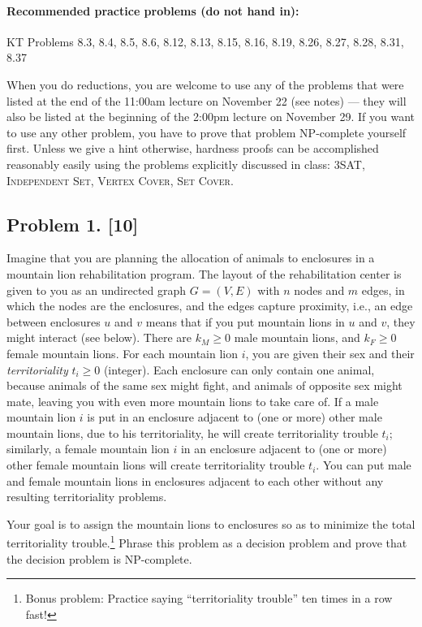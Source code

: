 \documentclass[10pt]{article}
\begin{document}
\paragraph{Recommended practice problems (do not hand in):} KT Problems 8.3, 8.4, 8.5, 8.6, 8.12, 8.13, 8.15, 8.16, 8.19, 8.26, 8.27, 8.28, 8.31, 8.37


\newpage

When you do reductions, you are welcome to use any of the problems that were listed at the end of the 11:00am lecture on November 22 (see notes) --- they will also be listed at the beginning of the 2:00pm lecture on November 29. If you want to use any other problem, you have to prove that problem NP-complete yourself first.
Unless we give a hint otherwise, hardness proofs can be accomplished reasonably easily using the problems explicitly discussed in class: \textsc{3SAT}, \textsc{Independent Set}, \textsc{Vertex Cover}, \textsc{Set Cover}.

\subsection*{Problem 1. [10]}
  Imagine that you are planning the allocation of animals to enclosures in a mountain lion rehabilitation program. The layout of the rehabilitation center is given to you as an undirected graph $G=(V,E)$ with $n$ nodes and $m$ edges, in which the nodes are the enclosures, and the edges capture proximity, i.e., an edge between enclosures $u$ and $v$ means that if you put mountain lions in $u$ and $v$, they might interact (see below).
  There are $k_M \geq 0$ male mountain lions, and $k_F \geq 0$ female mountain lions. For each mountain lion $i$, you are given their sex and their \emph{territoriality} $t_i \geq 0$ (integer). Each enclosure can only contain one animal, because animals of the same sex might fight, and animals of opposite sex might mate, leaving you with even more mountain lions to take care of.
  If a male mountain lion $i$ is put in an enclosure adjacent to (one or more) other male mountain lions, due to his territoriality, he will create territoriality trouble $t_i$; similarly, a female mountain lion $i$ in an enclosure adjacent to (one or more) other female mountain lions will create territoriality trouble $t_i$.
  You can put male and female mountain lions in enclosures adjacent to each other without any resulting territoriality problems.

  Your goal is to assign the mountain lions to enclosures so as to minimize the total territoriality trouble.\footnote{Bonus problem: Practice saying ``territoriality trouble'' ten times in a row fast!} Phrase this problem as a decision problem and prove that the decision problem is NP-complete.
\end{document}
